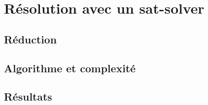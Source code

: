 \documentclass[a4paper,10pt]{article}
\begin{document}
\section{Résolution avec un sat-solver}


\subsection{Réduction}

\subsection{Algorithme et complexité}


\subsection{Résultats}
\end{document}
